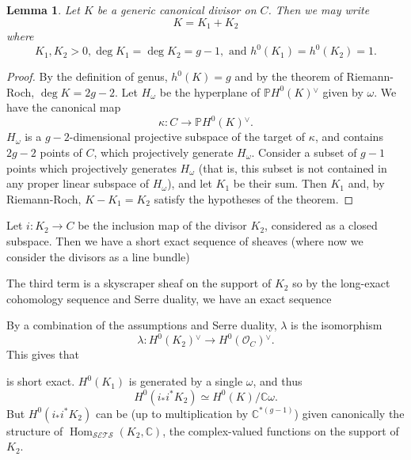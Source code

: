 \documentclass[11pt]{amsart}
\newtheorem{lemma}[thm]{Lemma}
\numberwithin{thm}{section}
\begin{document}
\begin{lemma} Let $K$ be a generic canonical divisor on $C$.  Then we may write \[K = K_1 + K_2\] where \[K_1, K_2 > 0, \deg K_1 = \deg K_2 = g-1,\text{ and }h^0(K_1) = h^0(K_2) = 1.\]\end{lemma}
\begin{proof} By the definition of genus, $h^0(K) = g$ and by the theorem of Riemann-Roch, $\deg K = 2g - 2$.  Let $H_{\omega}$ be the hyperplane of $\mathbb{P}H^0(K){^\vee}$ given by $\omega$.  We have the canonical map \[
\kappa: C\rightarrow \mathbb{P}H^0(K){^\vee}.
\]
$H_\omega$ is a $g-2$-dimensional projective subspace of the target of $\kappa$, and contains $2g - 2$ points of $C$, which projectively generate $H_\omega$.  Consider a subset of $g-1$ points which projectively generates $H_\omega$ (that is, this subset is not contained in any proper linear subspace of $H_\omega$), and let $K_1$ be their sum.  Then $K_1$ and, by Riemann-Roch, $K - K_1 = K_2$ satisfy the hypotheses of the theorem.
\end{proof}
Let $i: K_2\rightarrow C$ be the inclusion map of the divisor $K_2$, considered as a closed subspace.  Then we have a short exact sequence of sheaves (where now we consider the divisors as a line bundle)
\begin{center}
\mbox{}
\end{center}
The third term is a skyscraper sheaf on the support of $K_2$ so by the long-exact cohomology sequence and Serre duality, we have an exact sequence
\begin{center}
\mbox{}
\end{center}
By a combination of the assumptions and Serre duality, $\lambda$ is the isomorphism
\[
\lambda: H^0(K_2){^\vee}\rightarrow H^0(\mathcal{O}_C){^\vee}.
\]
This gives that
\begin{center}
\mbox{}
\end{center}
is short exact.  $H^0(K_1)$ is generated by a single $\omega$, and thus
\[
H^0(i_*i^* K_2)\simeq H^0(K)/{\mathbb{C}}\omega.
\]
But $H^0(i_*i^* K_2)$ can be (up to multiplication by ${\mathbb{C}}^{*(g - 1)}$) given canonically the structure of ${\operatorname{Hom}}_{\mathcal{SETS}}(K_2, \mathbb{C})$, the complex-valued functions on the support of $K_2$.
\end{document}
